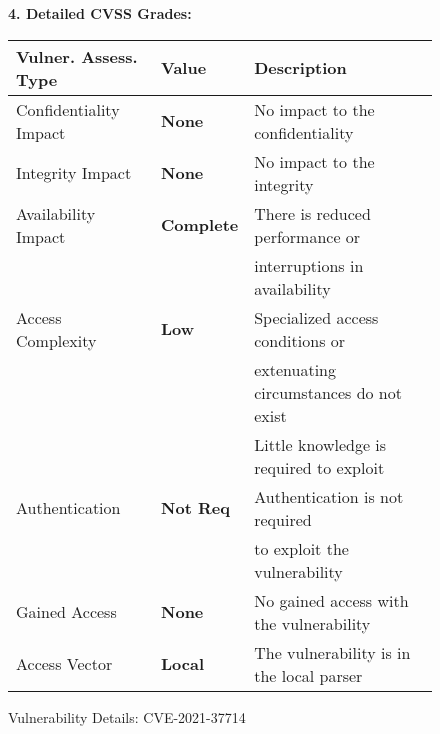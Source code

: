 \begin{figure}[t]
\begin{flushleft}
{\bf 4. Detailed CVSS Grades:}\\
\end{flushleft}
  \centering
  \tabcolsep 3pt
  \footnotesize
  \begin{tabular}{lll}
   Vulner. Assess. Type   & Value & Description \\
      \hline
    Confidentiality Impact & {\bf None}  & No impact to the confidentiality \\
    Integrity Impact & {\bf None}  & No impact to the integrity \\
    Availability Impact & {\bf Complete} & There is reduced performance or\\
    & & interruptions in availability\\
    Access Complexity & {\bf Low} & Specialized access conditions or \\
    & & extenuating circumstances do not exist\\
    & & Little knowledge is required to exploit\\
    Authentication & {\bf Not Req} & Authentication is not required \\
    & & to exploit the vulnerability\\
    Gained Access & {\bf None}  & No gained access with the vulnerability \\
    Access Vector & {\bf Local} & The vulnerability is in the local parser \\
    \end{tabular}%
  \vspace{-8pt}
\caption{Vulnerability Details: CVE-2021-37714}
\label{CVSS-tab}
\end{figure}

